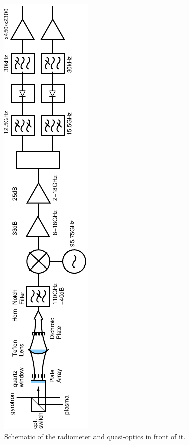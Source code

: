 \documentclass[aps,pra,twocolumn]{revtex4}
\begin{document}
\begin{widetext}
\begin{center}
  \begin{figure}[t]
      \includegraphics[angle=270,scale=0.95]{fig2.pdf} %
       \caption{\label{MicrowSetupFig} Schematic of the radiometer and 
         quasi-optics in front of it.}
  \end{figure}
\end{center}
\end{widetext}
\end{document}

